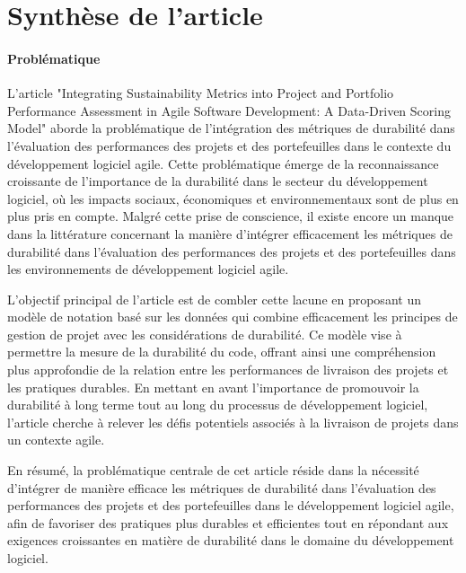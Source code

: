 \section{Synthèse de l'article}

\paragraph{Problématique}
L'article "Integrating Sustainability Metrics into Project and Portfolio Performance Assessment in Agile Software Development: A Data-Driven Scoring Model" aborde la problématique de l'intégration des métriques de durabilité dans l'évaluation des performances des projets et des portefeuilles dans le contexte du développement logiciel agile. Cette problématique émerge de la reconnaissance croissante de l'importance de la durabilité dans le secteur du développement logiciel, où les impacts sociaux, économiques et environnementaux sont de plus en plus pris en compte. Malgré cette prise de conscience, il existe encore un manque dans la littérature concernant la manière d'intégrer efficacement les métriques de durabilité dans l'évaluation des performances des projets et des portefeuilles dans les environnements de développement logiciel agile.

L'objectif principal de l'article est de combler cette lacune en proposant un modèle de notation basé sur les données qui combine efficacement les principes de gestion de projet avec les considérations de durabilité. Ce modèle vise à permettre la mesure de la durabilité du code, offrant ainsi une compréhension plus approfondie de la relation entre les performances de livraison des projets et les pratiques durables. En mettant en avant l'importance de promouvoir la durabilité à long terme tout au long du processus de développement logiciel, l'article cherche à relever les défis potentiels associés à la livraison de projets dans un contexte agile.

En résumé, la problématique centrale de cet article réside dans la nécessité d'intégrer de manière efficace les métriques de durabilité dans l'évaluation des performances des projets et des portefeuilles dans le développement logiciel agile, afin de favoriser des pratiques plus durables et efficientes tout en répondant aux exigences croissantes en matière de durabilité dans le domaine du développement logiciel.

